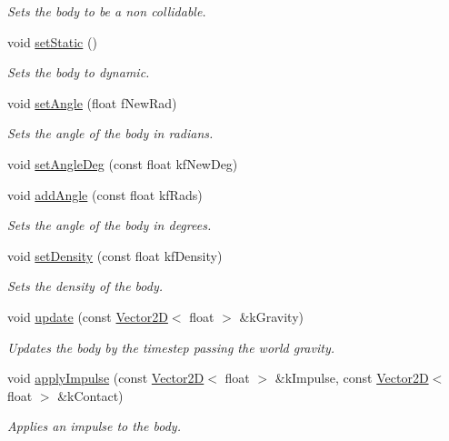 \begin{DoxyCompactItemize}
\begin{DoxyCompactList}\small\item\em Sets the body to be a non collidable. \end{DoxyCompactList}\item 
void \hyperlink{class_body2_d_a3eecaf97eb846f7a22afd326426ef976}{set\+Static} ()
\begin{DoxyCompactList}\small\item\em Sets the body to dynamic. \end{DoxyCompactList}\item 
void \hyperlink{class_body2_d_a965fe7a6d920ffb1027dd691070cd842}{set\+Angle} (float f\+New\+Rad)
\begin{DoxyCompactList}\small\item\em Sets the angle of the body in radians. \end{DoxyCompactList}\item 
void \hyperlink{class_body2_d_a7d14597b4f11c8343841038d29629e86}{set\+Angle\+Deg} (const float kf\+New\+Deg)
\item 
void \hyperlink{class_body2_d_a61efab7842abf77c748683d658930e62}{add\+Angle} (const float kf\+Rads)
\begin{DoxyCompactList}\small\item\em Sets the angle of the body in degrees. \end{DoxyCompactList}\item 
void \hyperlink{class_body2_d_adb2bf5ca96811517418044e13cd0d054}{set\+Density} (const float kf\+Density)
\begin{DoxyCompactList}\small\item\em Sets the density of the body. \end{DoxyCompactList}\item 
void \hyperlink{class_body2_d_a55a924e33d60711a39888f92a10afbd1}{update} (const \hyperlink{class_vector2_d}{Vector2\+D}$<$ float $>$ \&k\+Gravity)
\begin{DoxyCompactList}\small\item\em Updates the body by the timestep passing the world gravity. \end{DoxyCompactList}\item 
void \hyperlink{class_body2_d_afe9db9c16d070f5154d0ebc16bf08f44}{apply\+Impulse} (const \hyperlink{class_vector2_d}{Vector2\+D}$<$ float $>$ \&k\+Impulse, const \hyperlink{class_vector2_d}{Vector2\+D}$<$ float $>$ \&k\+Contact)
\begin{DoxyCompactList}\small\item\em Applies an impulse to the body. \end{DoxyCompactList}\item 

\end{DoxyCompactItemize}
